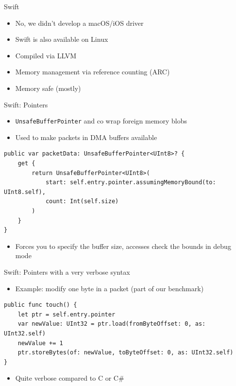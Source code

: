\documentclass[NET,english,aspectratio=169,notitleframe]{tumbeamer}
\begin{document}
\begin{frame}{Swift}
\begin{itemize}
\item No, we didn't develop a macOS/iOS driver
\item Swift is also available on Linux
\pause
\vspace{1em}
\item Compiled via LLVM
\item Memory management via reference counting (ARC)
\item Memory safe (mostly)
\end{itemize}
\end{frame}

\begin{frame}[fragile]{Swift: Pointers}
\begin{itemize}
\item \texttt{UnsafeBufferPointer} and co wrap foreign memory blobs
\item Used to make packets in DMA buffers available
\end{itemize}
\begin{verbatim}
public var packetData: UnsafeBufferPointer<UInt8>? {
    get {
        return UnsafeBufferPointer<UInt8>(
            start: self.entry.pointer.assumingMemoryBound(to: UInt8.self),
            count: Int(self.size)
        )
    }
}
\end{verbatim}
\begin{itemize}
\item Forces you to specify the buffer size, accesses check the bounds in debug mode
\end{itemize}
\end{frame}

\begin{frame}[fragile]{Swift: Pointers with a very verbose syntax}
\begin{itemize}
\item Example: modify one byte in a packet (part of our benchmark)
\end{itemize}
\begin{verbatim}
public func touch() {
    let ptr = self.entry.pointer
    var newValue: UInt32 = ptr.load(fromByteOffset: 0, as: UInt32.self)
    newValue += 1
    ptr.storeBytes(of: newValue, toByteOffset: 0, as: UInt32.self)
}
\end{verbatim}
\begin{itemize}
\item Quite verbose compared to C or C\#
\end{itemize}
\end{frame}
\end{document}
